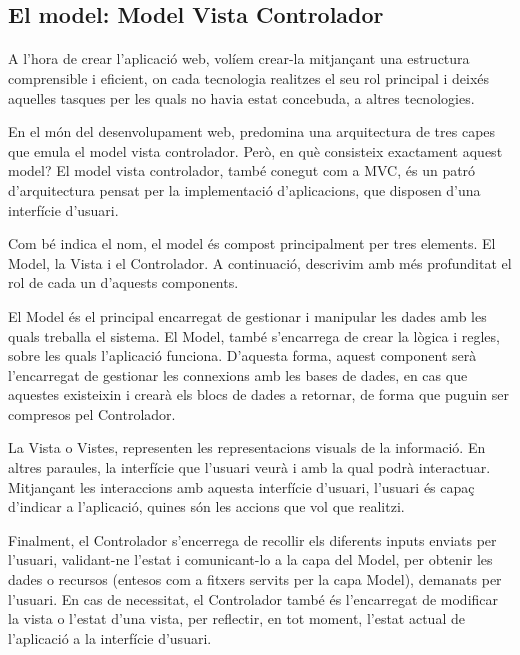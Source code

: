 \subsection{El model: Model Vista Controlador}\label{sec:mvc}

    \paragraph{}
    A l'hora de crear l’aplicació web, volíem crear-la mitjançant una estructura comprensible i eficient, on cada tecnologia realitzes el seu rol principal i deixés aquelles tasques per les quals no havia estat concebuda, a altres tecnologies.

    En el món del desenvolupament web, predomina una arquitectura de tres capes que emula el model vista controlador. Però, en què consisteix exactament aquest model? El model vista controlador, també conegut com a MVC, és un patró d'arquitectura pensat per la implementació d'aplicacions, que disposen d’una interfície d'usuari.

    Com bé indica el nom, el model és compost principalment per tres elements. El Model, la Vista i el Controlador. A continuació, descrivim amb més profunditat el rol de cada un d’aquests components.

    El Model és el principal encarregat de gestionar i manipular les dades amb les quals treballa el sistema. El Model, també s’encarrega de crear la lògica i regles, sobre les quals l'aplicació funciona. D’aquesta forma, aquest component serà l’encarregat de gestionar les connexions amb les bases de dades, en cas que aquestes existeixin i crearà els blocs de dades a retornar, de forma que puguin ser compresos pel Controlador.

    La Vista o Vistes, representen les representacions visuals de la informació. En altres paraules, la interfície que l’usuari veurà i amb la qual podrà interactuar. Mitjançant les interaccions amb aquesta interfície d'usuari, l'usuari és capaç d’indicar a l’aplicació, quines són les accions que vol que realitzi.

    Finalment, el Controlador s'encerrega de recollir els diferents inputs enviats per l'usuari, validant-ne l'estat i comunicant-lo a la capa del Model, per obtenir les dades o recursos (entesos com a fitxers servits per la capa Model), demanats per l’usuari. En cas de necessitat, el Controlador també és l’encarregat de modificar la vista o l’estat d’una vista, per reflectir, en tot moment, l’estat actual de l’aplicació a la interfície d’usuari.

